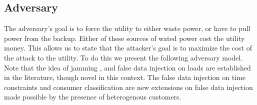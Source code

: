 \documentclass[conference]{IEEEtran}
\begin{document}
\subsection{Adversary}
\label{Adversary}

The adversary's goal is to force the utility to either waste power, or have to pull power from the backup. Either of these sources of wated power cost the utility money. This allows us to state that the attacker's goal is to maximize the cost of the attack to the utility. To do this we present the following adversary model. Note that the idea of jamming \cite{gupta2010optimal}, and false data injection on loads \cite{lin2012false}\cite{yuan2011modeling} are established in the literature, though novel in this context. The false data injection on time constraints and consumer classification are new extensions on false data injection made possible by the presence of heterogenous customers.
\end{document}
